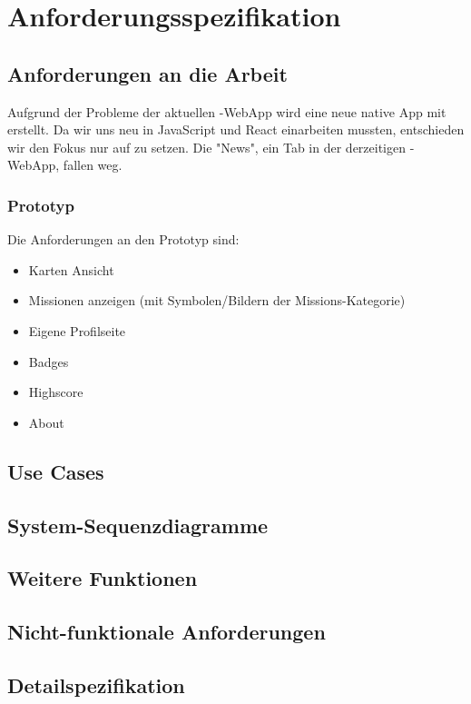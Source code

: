 \chapter{Anforderungsspezifikation}
\label{pd-anforderungsspezifikation}


\section{Anforderungen an die Arbeit} 
Aufgrund der Probleme der aktuellen \kort{}-\gls{WebApp} wird eine neue native App mit  erstellt. 
Da wir uns neu in JavaScript und React einarbeiten mussten, entschieden wir den Fokus nur auf  zu setzen.
Die "News", ein Tab in der derzeitigen \kort{}-\gls{WebApp}, fallen weg.


\subsection{Prototyp}
Die Anforderungen an den Prototyp sind: 

\begin{itemize}
	\item Karten Ansicht
	\item Missionen anzeigen (mit Symbolen/Bildern der Missions-Kategorie)
	\item Eigene Profilseite
	\item Badges
	\item Highscore
	\item About
\end{itemize}

\section{Use Cases}


\section{System-Sequenzdiagramme}


\section{Weitere Funktionen}


\section{Nicht-funktionale Anforderungen}


\section{Detailspezifikation}

